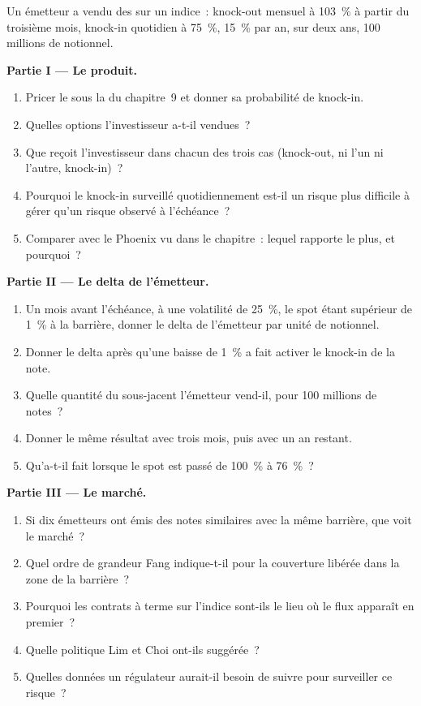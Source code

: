 \begin{problem}\label{pb:dv:autocallables:1}
Un émetteur a vendu des  sur un indice~: knock-out mensuel à 103~\% à partir du troisième mois, knock-in quotidien à 75~\%, 15~\% par an, sur deux
ans, 100 millions de notionnel.

\medskip\noindent\textbf{Partie I --- Le produit.}
\begin{enumerate}
\item Pricer le  sous la  du chapitre~9 et donner sa probabilité de knock-in.
\item Quelles options l'investisseur a-t-il vendues~?
\item Que reçoit l'investisseur dans chacun des trois cas (knock-out, ni l'un ni l'autre, knock-in)~?
\item Pourquoi le knock-in surveillé quotidiennement est-il un risque plus difficile à gérer qu'un risque observé à l'échéance~?
\item Comparer avec le Phoenix vu dans le chapitre~: lequel rapporte le plus, et pourquoi~?
\end{enumerate}

\medskip\noindent\textbf{Partie II --- Le delta de l'émetteur.}
\begin{enumerate}[resume]
\item Un mois avant l'échéance, à une volatilité de 25~\%, le spot étant supérieur de 1~\% à la barrière, donner le delta de l'émetteur par unité de notionnel.
\item Donner le delta après qu'une baisse de 1~\% a fait activer le knock-in de la note.
\item Quelle quantité du sous-jacent l'émetteur vend-il, pour 100 millions de notes~?
\item Donner le même résultat avec trois mois, puis avec un an restant.
\item Qu'a-t-il fait lorsque le spot est passé de 100~\% à 76~\%~?
\end{enumerate}

\medskip\noindent\textbf{Partie III --- Le marché.}
\begin{enumerate}[resume]
\item Si dix émetteurs ont émis des notes similaires avec la même barrière, que voit le marché~?
\item Quel ordre de grandeur Fang indique-t-il pour la couverture libérée dans la zone de la barrière~?
\item Pourquoi les contrats à terme sur l'indice sont-ils le lieu où le flux apparaît en premier~?
\item Quelle politique Lim et Choi ont-ils suggérée~?
\item Quelles données un régulateur aurait-il besoin de suivre pour surveiller ce risque~?
\end{enumerate}


\end{problem}
